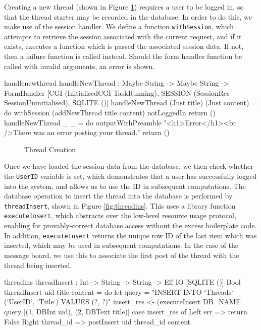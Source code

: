 \noindent
Creating a new thread (shown in Figure \ref{fig:handlethread})
requires a user to be logged in, so that the thread
starter may be recorded in the database. In order to do this, we make use of
the session handler. We define a function \texttt{withSession}, which attempts
to retrieve the session associated with the current request, and if it exists,
executes a function which is passed the associated session data. If not, then a
failure function is called instead. Should the form handler function be called
with invalid arguments, an error is shown.

\begin{SaveVerbatim}{handlenewthread}
handleNewThread : 
  Maybe String -> Maybe String -> 
  FormHandler [CGI (InitialisedCGI TaskRunning), 
               SESSION (SessionRes SessionUninitialised), 
               SQLITE ()]  
handleNewThread (Just title) (Just content) = do 
  withSession (addNewThread title content) notLoggedIn
  return ()
handleNewThread _ _ = do 
  outputWithPreamble "<h1>Error</h1><br />There was 
       an error posting your thread."
  return ()
\end{SaveVerbatim}

\begin{figure}[h]
\caption{Thread Creation}
\label{fig:handlethread}
\end{figure}

\noindent
Once we have loaded the session data from the database, we then check whether
the \texttt{UserID} variable is set, which demonstrates that a user has
successfully logged into the system, and allows us to use the ID in subsequent
computations. The database operation to insert the thread into the database is
performed by \texttt{threadInsert}, shown in Figure \ref{fig:threadins}.
This uses a library function \texttt{executeInsert}, which abstracts over the
low-level resource usage protocol, enabling for provably-correct database
access without the excess boilerplate code. In addition, \texttt{executeInsert}
returns the unique row ID of the last item which was inserted, which may be
used in subsequent computations. In the case of the message board, we use this
to associate the first post of the thread with the thread being inserted.

\begin{SaveVerbatim}{threadins}
threadInsert : Int -> String -> String -> 
               Eff IO [SQLITE ()] Bool
threadInsert uid title content = do
  let query = "INSERT INTO `Threads` 
    (`UserID`, `Title`) VALUES (?, ?)"
  insert_res <- (executeInsert DB_NAME query 
    [(1, DBInt uid), (2, DBText title)]
  case insert_res of
    Left err => return False
    Right thread_id => postInsert uid thread_id content
\end{SaveVerbatim}

